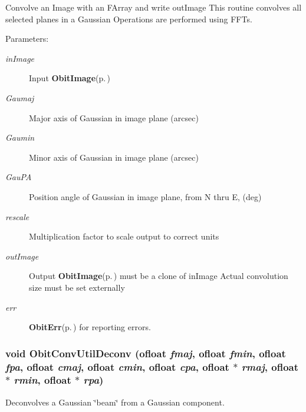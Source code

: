 Convolve an Image with an FArray and write out\-Image This routine convolves all selected planes in a Gaussian Operations are performed using FFTs. 

\begin{Desc}
\item[Parameters:]
\begin{description}
\item[{\em in\-Image}]Input {\bf Obit\-Image}{\rm (p.\,\pageref{structObitImage})} \item[{\em Gaumaj}]Major axis of Gaussian in image plane (arcsec) \item[{\em Gaumin}]Minor axis of Gaussian in image plane (arcsec) \item[{\em Gau\-PA}]Position angle of Gaussian in image plane, from N thru E, (deg) \item[{\em rescale}]Multiplication factor to scale output to correct units \item[{\em out\-Image}]Output {\bf Obit\-Image}{\rm (p.\,\pageref{structObitImage})} must be a clone of in\-Image Actual convolution size must be set externally \item[{\em err}]{\bf Obit\-Err}{\rm (p.\,\pageref{structObitErr})} for reporting errors. \end{description}
\end{Desc}
\subsubsection{\setlength{\rightskip}{0pt plus 5cm}void Obit\-Conv\-Util\-Deconv ({\bf ofloat} {\em fmaj}, {\bf ofloat} {\em fmin}, {\bf ofloat} {\em fpa}, {\bf ofloat} {\em cmaj}, {\bf ofloat} {\em cmin}, {\bf ofloat} {\em cpa}, {\bf ofloat} $\ast$ {\em rmaj}, {\bf ofloat} $\ast$ {\em rmin}, {\bf ofloat} $\ast$ {\em rpa})}\label{ObitConvUtil_8c_a3}


Deconvolves a Gaussian \char`\"{}beam\char`\"{} from a Gaussian component. 

